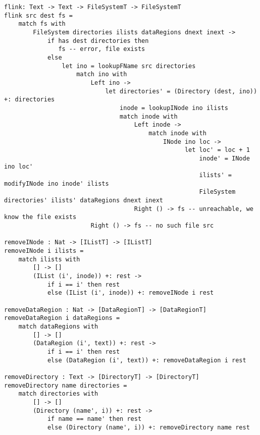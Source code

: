 \documentclass[logo,bsc,singlespacing,parskip]{infthesis}
\begin{document}
\begin{lstlisting}[language=unison]
flink: Text -> Text -> FileSystemT -> FileSystemT
flink src dest fs =
    match fs with
        FileSystem directories ilists dataRegions dnext inext ->
            if has dest directories then
               fs -- error, file exists
            else
                let ino = lookupFName src directories
                    match ino with
                        Left ino ->
                            let directories' = (Directory (dest, ino)) +: directories
                                inode = lookupINode ino ilists
                                match inode with
                                    Left inode ->
                                        match inode with
                                            INode ino loc ->
                                                  let loc' = loc + 1
                                                      inode' = INode ino loc'
                                                      ilists' = modifyINode ino inode' ilists
                                                      FileSystem directories' ilists' dataRegions dnext inext
                                    Right () -> fs -- unreachable, we know the file exists
                        Right () -> fs -- no such file src

removeINode : Nat -> [IListT] -> [IListT]
removeINode i ilists =
    match ilists with
        [] -> []
        (IList (i', inode)) +: rest ->
            if i == i' then rest
            else (IList (i', inode)) +: removeINode i rest

removeDataRegion : Nat -> [DataRegionT] -> [DataRegionT]
removeDataRegion i dataRegions =
    match dataRegions with
        [] -> []
        (DataRegion (i', text)) +: rest ->
            if i == i' then rest
            else (DataRegion (i', text)) +: removeDataRegion i rest

removeDirectory : Text -> [DirectoryT] -> [DirectoryT]
removeDirectory name directories =
    match directories with
        [] -> []
        (Directory (name', i)) +: rest ->
            if name == name' then rest
            else (Directory (name', i)) +: removeDirectory name rest


\end{lstlisting}
\end{document}
